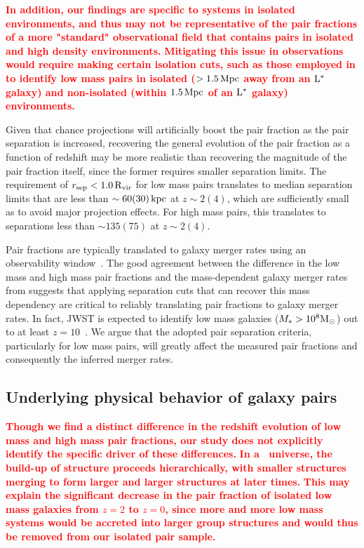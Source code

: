 \documentclass[linenumbers,twocolumn]{aastex631}
\newcommand{\add}[1]{\textcolor{red}{\textbf{#1}}}
\newcommand{\Rvir}{\ensuremath{\rm R_{vir}}}
\begin{document}
    \add{In addition, our findings are specific to systems in isolated environments, and thus may not be representative of the pair fractions of a more "standard" observational field that contains pairs in isolated and high density environments.}
    \add{Mitigating this issue in observations would require making certain isolation cuts, such as those employed in \citet{Geha2013} to identify low mass pairs in isolated ($>1.5\,\mathrm{Mpc}$ away from an $\rm L^{*}$ galaxy) and non-isolated (within $1.5\,\mathrm{Mpc}$ of an $\rm L^{*}$ galaxy) environments.}

    Given that chance projections will artificially boost the pair fraction as the pair separation is increased, recovering the general evolution of the pair fraction as a function of redshift may be more realistic than recovering the magnitude of the pair fraction itself, since the former requires smaller separation limits. 
    The requirement of $r_{\mathrm{sep}} < 1.0\,\Rvir$ for low mass pairs translates to median separation limits that are less than $\sim 60(30)\mathrm{\,kpc}$ at $z \sim2(4)$, which are sufficiently small as to avoid major projection effects. 
    For high mass pairs, this translates to separations less than $\sim135(75)$ at $z\sim2(4)$.

    Pair fractions are typically translated to galaxy merger rates using an observability window~\citep{Lotz2011}.
    The good agreement between the difference in the low mass and high mass pair fractions and the mass-dependent galaxy merger rates from \cite{RG2015} suggests that applying separation cuts that can recover this mass dependency are critical to reliably translating pair fractions to galaxy merger rates. 
    In fact, JWST is expected to identify low mass galaxies ($M_* > 10^8\mathrm{M}_\odot$) out to at least $z=10$~\citep{Cowley2018,Williams2018,Behroozi2020}. 
    We argue that the adopted pair separation criteria, particularly for low mass pairs, will greatly affect the measured pair fractions and consequently the inferred merger rates. 
    
\subsection{Underlying physical behavior of galaxy pairs}\label{sec:disc-diff}
    \add{Though we find a distinct difference in the redshift evolution of low mass and high mass pair fractions, our study does not explicitly identify the specific driver of these differences.}
    \add{In a \lcdm\ universe, the build-up of structure proceeds hierarchically, with smaller structures merging to form larger and larger structures at later times.}
    \add{This may explain the significant decrease in the pair fraction of isolated low mass galaxies from $z=2$ to $z=0$, since more and more low mass systems would be accreted into larger group structures and would thus be removed from our isolated pair sample.}
    
\end{document}
